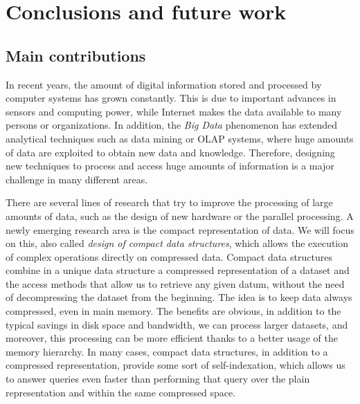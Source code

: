 
\chapter{Conclusions and future work}
\label{sec:summary:conclusion-future-work}



\section{Main contributions}
	In recent years, the amount of digital information stored and processed by computer systems has grown constantly. This is due to important advances in sensors and computing power, while Internet makes the data available to many persons or organizations. In addition, the {\em Big Data} phenomenon has extended analytical techniques such as data mining or OLAP systems, where huge amounts of data are exploited to obtain new data and knowledge. Therefore, designing new techniques to process and access huge amounts of information is a major challenge in many different areas.

	There are several lines of research that try to improve the processing of large amounts of data, such as the design of new hardware or the parallel processing. A newly emerging research area is the compact representation of data. We will focus on this, also called \textit{design of compact data structures}, which allows the execution of complex operations directly on compressed data. 
	Compact data structures combine in a unique data structure a compressed representation of a dataset and the access methods that allow us to retrieve any given datum, without the need of decompressing the dataset from the beginning. The idea is to keep data always compressed, even in main memory. The benefits are obvious, in addition to the typical savings in disk space and bandwidth, we can process larger datasets, and moreover, this processing can be more efficient thanks to a better usage of the memory hierarchy. In many cases, compact data structures, in addition to a compressed representation, provide some sort of self-indexation, which allows us to answer queries even faster than performing that query over the plain representation and within the same compressed space.
	
